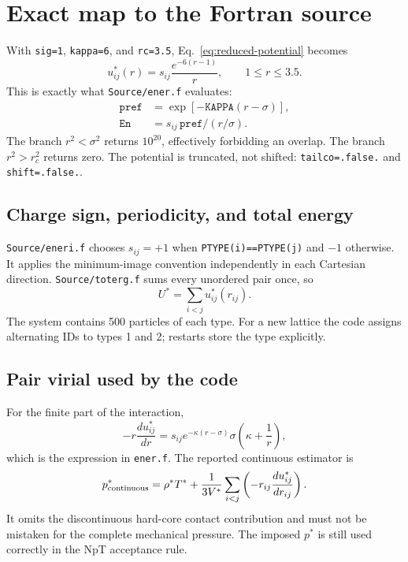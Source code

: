 \documentclass[11pt,a4paper]{article}
\newcommand{\code}[1]{\texttt{#1}}
\newcommand{\sgnq}{s_{ij}}
\begin{document}
\section{Exact map to the Fortran source}
With \code{sig=1}, \code{kappa=6}, and \code{rc=3.5},
Eq.~\eqref{eq:reduced-potential} becomes
\begin{equation}
 u^*_{ij}(r)=\sgnq\frac{e^{-6(r-1)}}{r},
 \qquad 1\le r\le3.5.
 \label{eq:actual-code-potential}
\end{equation}
This is exactly what \code{Source/ener.f} evaluates:
\begin{align}
 \code{pref}&=\exp[-\code{KAPPA}(r-\sigma)],\\
 \code{En}&=\sgnq\,\code{pref}/(r/\sigma).
\end{align}
The branch $r^2<\sigma^2$ returns $10^{20}$, effectively forbidding an
overlap.  The branch $r^2>r_c^2$ returns zero.  The potential is truncated,
not shifted: \code{tailco=.false.} and \code{shift=.false.}.

\subsection{Charge sign, periodicity, and total energy}
\code{Source/eneri.f} chooses $\sgnq=+1$ when \code{PTYPE(i)==PTYPE(j)} and
$-1$ otherwise.  It applies the minimum-image convention independently in
each Cartesian direction.  \code{Source/toterg.f} sums every unordered pair
once, so
\begin{equation}
 U^*=\sum_{i<j}u^*_{ij}(r_{ij}).
\end{equation}
The system contains 500 particles of each type.  For a new lattice the code
assigns alternating IDs to types 1 and 2; restarts store the type explicitly.

\subsection{Pair virial used by the code}
For the finite part of the interaction,
\begin{equation}
 -r\frac{du^*_{ij}}{dr}
 =\sgnq e^{-\kappa(r-\sigma)}\sigma
 \left(\kappa+\frac{1}{r}\right),
\end{equation}
which is the expression in \code{ener.f}.  The reported continuous estimator
is
\begin{equation}
 p^*_{\rm continuous}=\rho^*T^*+\frac{1}{3V^*}
 \sum_{i<j}\left(-r_{ij}\frac{du^*_{ij}}{dr_{ij}}\right).
\end{equation}
It omits the discontinuous hard-core contact contribution and must not be
mistaken for the complete mechanical pressure.  The imposed $p^*$ is still
used correctly in the NpT acceptance rule.
\end{document}
